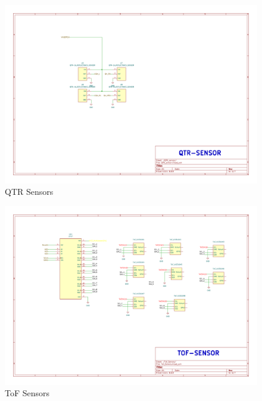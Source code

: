 \documentclass[../../main]{subfiles}
\begin{document}
\begin{figure}[p] %
    \centering
    \includegraphics[width=0.98\textheight,angle=90]{fig/agv_wire-QTR_sensor.pdf}
    \caption{QTR Sensors}
\end{figure}

\newpage

\begin{figure}[p] %
    \centering
    \includegraphics[width=0.98\textheight,angle=90]{fig/agv_wire-Tof_Senors.pdf}
    \caption{ToF Sensors}
\end{figure}
\end{document}
